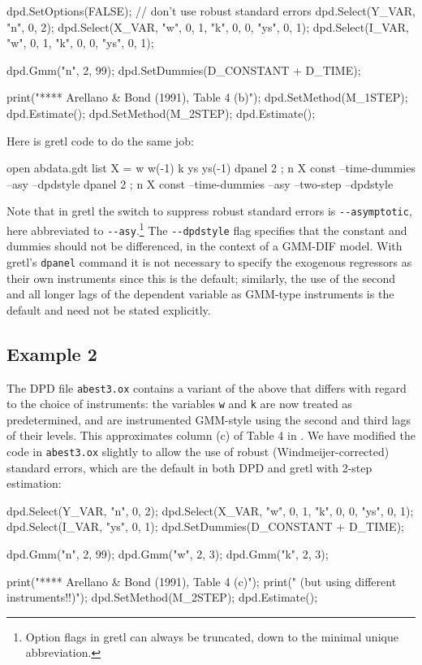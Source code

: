 \begin{code}
dpd.SetOptions(FALSE); // don't use robust standard errors
dpd.Select(Y_VAR, {"n", 0, 2});
dpd.Select(X_VAR, {"w", 0, 1, "k", 0, 0, "ys", 0, 1});
dpd.Select(I_VAR, {"w", 0, 1, "k", 0, 0, "ys", 0, 1});

dpd.Gmm("n", 2, 99);
dpd.SetDummies(D_CONSTANT + D_TIME);

print("\n\n***** Arellano & Bond (1991), Table 4 (b)");
dpd.SetMethod(M_1STEP);
dpd.Estimate();
dpd.SetMethod(M_2STEP);
dpd.Estimate();
\end{code}

Here is gretl code to do the same job:

\begin{code}
open abdata.gdt
list X = w w(-1) k ys ys(-1)
dpanel 2 ; n X const --time-dummies --asy --dpdstyle
dpanel 2 ; n X const --time-dummies --asy --two-step --dpdstyle
\end{code}

Note that in gretl the switch to suppress robust standard errors is
\verb|--asymptotic|, here abbreviated to \verb|--asy|.\footnote{Option
  flags in gretl can always be truncated, down to the minimal unique
  abbreviation.} The \verb|--dpdstyle| flag specifies that the
constant and dummies should not be differenced, in the context of a
GMM-DIF model. With gretl's \texttt{dpanel} command it is not
necessary to specify the exogenous regressors as their own instruments
since this is the default; similarly, the use of the second and all
longer lags of the dependent variable as GMM-type instruments is the
default and need not be stated explicitly. 

\subsection{Example 2}

The DPD file \texttt{abest3.ox} contains a variant of the above that
differs with regard to the choice of instruments: the variables
\texttt{w} and \texttt{k} are now treated as predetermined, and are
instrumented GMM-style using the second and third lags of their
levels. This approximates column (c) of Table 4 in
\cite{arellano-bond91}.  We have modified the code in
\texttt{abest3.ox} slightly to allow the use of robust
(Windmeijer-corrected) standard errors, which are the default in both
DPD and gretl with 2-step estimation:

\begin{code}
dpd.Select(Y_VAR, {"n", 0, 2});
dpd.Select(X_VAR, {"w", 0, 1, "k", 0, 0, "ys", 0, 1});
dpd.Select(I_VAR, {"ys", 0, 1});
dpd.SetDummies(D_CONSTANT + D_TIME);

dpd.Gmm("n", 2, 99);
dpd.Gmm("w", 2, 3);
dpd.Gmm("k", 2, 3);

print("\n***** Arellano & Bond (1991), Table 4 (c)\n");
print("        (but using different instruments!!)\n");
dpd.SetMethod(M_2STEP);
dpd.Estimate();
\end{code}

